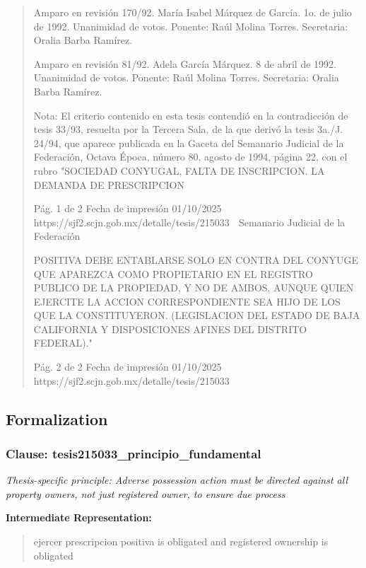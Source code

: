 \documentclass[11pt,a4paper]{article}
\begin{document}
\begin{quote}
Amparo en revisión 170/92. María Isabel Márquez de García. 1o. de julio de 1992. Unanimidad de
votos. Ponente: Raúl Molina Torres. Secretaria: Oralia Barba Ramírez.

Amparo en revisión 81/92. Adela García Márquez. 8 de abril de 1992. Unanimidad de votos.
Ponente: Raúl Molina Torres. Secretaria: Oralia Barba Ramírez.

Nota: El criterio contenido en esta tesis contendió en la contradicción de tesis 33/93, resuelta por la
Tercera Sala, de la que derivó la tesis 3a./J. 24/94, que aparece publicada en la Gaceta del
Semanario Judicial de la Federación, Octava Época, número 80, agosto de 1994, página 22, con el
rubro "SOCIEDAD CONYUGAL, FALTA DE INSCRIPCION. LA DEMANDA DE PRESCRIPCION


                                              Pág. 1 de 2             Fecha de impresión 01/10/2025
  https://sjf2.scjn.gob.mx/detalle/tesis/215033
                                                 Semanario Judicial de la Federación

POSITIVA DEBE ENTABLARSE SOLO EN CONTRA DEL CONYUGE QUE APAREZCA COMO
PROPIETARIO EN EL REGISTRO PUBLICO DE LA PROPIEDAD, Y NO DE AMBOS, AUNQUE
QUIEN EJERCITE LA ACCION CORRESPONDIENTE SEA HIJO DE LOS QUE LA
CONSTITUYERON. (LEGISLACION DEL ESTADO DE BAJA CALIFORNIA Y DISPOSICIONES
AFINES DEL DISTRITO FEDERAL)."




                                            Pág. 2 de 2       Fecha de impresión 01/10/2025
 https://sjf2.scjn.gob.mx/detalle/tesis/215033

\end{quote}

\subsection{Formalization}

\subsubsection{Clause: tesis215033\_principio\_fundamental}

\textit{Thesis-specific principle: Adverse possession action must be directed against all property owners, not just registered owner, to ensure due process}

\textbf{Intermediate Representation:}

\begin{quote}
ejercer prescripcion positiva is obligated and registered ownership is obligated
\end{quote}
\end{document}
